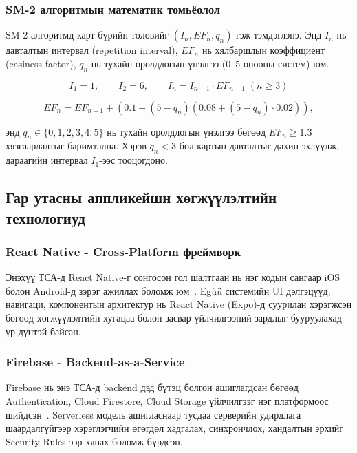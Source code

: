 \subsubsection{SM-2 алгоритмын математик томьёолол}

SM-2 алгоритмд карт бүрийн төлөвийг $(I_n, EF_n, q_n)$ гэж тэмдэглэнэ. Энд
$I_n$ нь давталтын интервал (repetition interval),
$EF_n$ нь хялбаршлын коэффициент (easiness factor),
$q_n$ нь тухайн оролдлогын үнэлгээ ($0$–$5$ онооны систем) юм.

\begin{equation}
I_1 = 1, \qquad I_2 = 6, \qquad I_n = I_{n-1} \cdot EF_{n-1} \; (n \ge 3)
\end{equation}

\begin{equation}
EF_n = EF_{n-1} + \left(0.1 - (5-q_n)\left(0.08 + (5-q_n)\cdot 0.02\right)\right),
\end{equation}

энд $q_n \in \{0,1,2,3,4,5\}$ нь тухайн оролдлогын үнэлгээ бөгөөд $EF_n \ge 1.3$ хязгаарлалтыг баримтална. Хэрэв $q_n < 3$ бол картын давталтыг дахин эхлүүлж, дараагийн интервал $I_1$-ээс тооцогдоно.

\subsection{Гар утасны аппликейшн хөгжүүлэлтийн технологиуд}
\label{subsec:mobile-technologies}

\subsubsection{React Native - Cross-Platform фреймворк}

Энэхүү ТСА-д React Native-г сонгосон гол шалтгаан нь нэг кодын сангаар iOS болон Android-д зэрэг ажиллах боломж юм~\cite{nack2016learning}. Egüü системийн UI дэлгэцүүд, навигаци, компонентын архитектур нь React Native (Expo)-д суурилан хэрэгжсэн бөгөөд хөгжүүлэлтийн хугацаа болон засвар үйлчилгээний зардлыг бууруулахад үр дүнтэй байсан.

\subsubsection{Firebase - Backend-as-a-Service}

Firebase нь энэ ТСА-д backend дэд бүтэц болгон ашиглагдсан бөгөөд Authentication, Cloud Firestore, Cloud Storage үйлчилгээг нэг платформоос шийдсэн~\cite{welekar2017firebase}. Serverless модель ашигласнаар тусдаа серверийн удирдлага шаардалгүйгээр хэрэглэгчийн өгөгдөл хадгалах, синхрончлох, хандалтын эрхийг Security Rules-ээр хянах боломж бүрдсэн.

